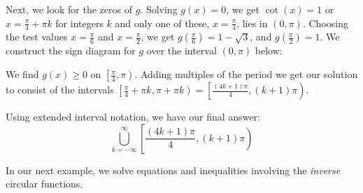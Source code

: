 \documentclass{ximera}
\begin{document}
\begin{example}
\begin{explanation}
\begin{enumerate}
 

Next, we look for the zeros of $g$.  Solving $g(x) = 0$, we get $\cot(x) = 1$ or $x = \frac{\pi}{4} + \pi k$ for integers $k$ and only one of these, $x = \frac{\pi}{4}$, lies in $(0,\pi)$.   Choosing the test values $x = \frac{\pi}{6}$ and $x = \frac{\pi}{2}$, we get $g\left(\frac{\pi}{6}\right) = 1 - \sqrt{3}$, and $g\left(\frac{\pi}{2}\right) = 1$.   We construct the sign diagram for $g$ over the interval $(0, \pi)$ below:

\begin{image}
% 
\end{image}

We find $g(x) \geq 0$ on $\left[\frac{\pi}{4}, \pi \right)$.  Adding multiples of the period we get our solution to consist of the intervals  $\left[\frac{\pi}{4} + \pi k, \pi + \pi k  \right) = \left[\frac{(4k+1)\pi}{4}, (k+1)\pi \right)$.  

 

Using extended interval notation, we have our final answer:
\[\bigcup_{k = -\infty}^{\infty} \left[\dfrac{(4k+1)\pi}{4}, (k+1)\pi \right)\]



\end{enumerate}
\end{explanation}
\end{example}

In our next example, we solve equations and inequalities involving the \textit{inverse} circular functions.
\end{document}
